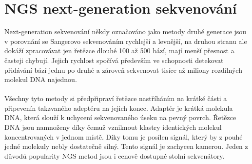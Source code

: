 \documentclass[czech,DP]{thesiskiv}
\numberwithin{equation}{section}
\begin{document}
\section{NGS next-generation sekvenování}
Next-generation sekvenování někdy označováno jako metody druhé generace jsou v porovnání se Sangerovo sekvenováním rychlejší a levnější, na druhou stranu ale dokáží zpracovávat jen řetězce dlouhé 100 až 500 bází, mají menší přesnost a časteji chybují. Jejich rychlost spočívá především ve schopnosti detekovat přidávání bází jednu po druhé a zároveň sekvenovat tisíce až miliony rozdílných molekul DNA najednou. 
\\
\\
Všechny tyto metody si předpřipraví řetězce nastříháním na krátké části a připevenín takzvaného adeptéru na jejich konec. Adaptér je krátká molekula DNA, která slouží k uchycení sekvenovaného úseku na pevný povrch. Řetězce DNA jsou namnoženy díky čemuž vzniknout klastry identických molekul koncentrovaných v jednom místě. Díky tomu je posílen signál, který by z pouhé jedné molekuly nebly dostatečně silný. Tento signál je zachycen kamerou. Jeden z důvodů popularity NGS metod jsou i cenově dostupné stolní sekvenátory.
 
\end{document}
